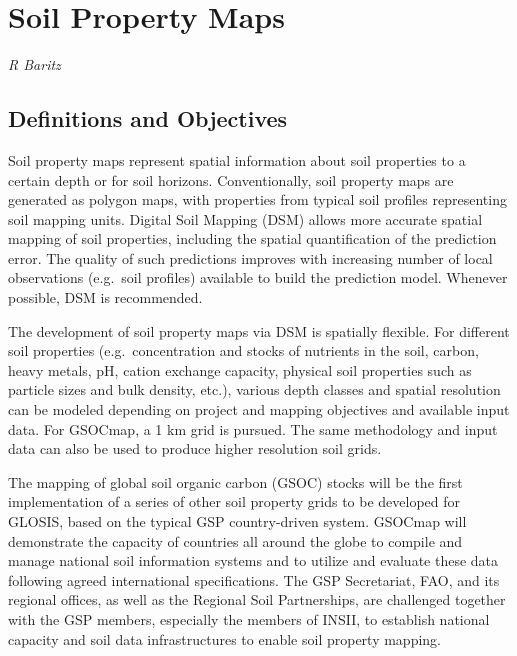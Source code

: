 \documentclass[10pt,b5paper,]{book}
\theoremstyle{definition}
\theoremstyle{definition}
\theoremstyle{definition}
\theoremstyle{remark}
\begin{document}
\hypertarget{soil-property-maps}{%
\chapter{Soil Property Maps}\label{soil-property-maps}}

\emph{R Baritz}

\hypertarget{definitions-and-objectives}{%
\section{Definitions and Objectives}\label{definitions-and-objectives}}

Soil property maps represent spatial information about soil properties
to a certain depth or for soil horizons. Conventionally, soil property
maps are generated as polygon maps, with properties from typical soil
profiles representing soil mapping units. Digital Soil Mapping (DSM)
allows more accurate spatial mapping of soil properties, including the
spatial quantification of the prediction error. The quality of such
predictions improves with increasing number of local observations
(e.g.~soil profiles) available to build the prediction model. Whenever
possible, DSM is recommended.

The development of soil property maps via DSM is spatially flexible. For
different soil properties (e.g.~concentration and stocks of nutrients in
the soil, carbon, heavy metals, pH, cation exchange capacity, physical
soil properties such as particle sizes and bulk density, etc.), various
depth classes and spatial resolution can be modeled depending on project
and mapping objectives and available input data. For GSOCmap, a 1 km
grid is pursued. The same methodology and input data can also be used to
produce higher resolution soil grids.

The mapping of global soil organic carbon (GSOC) stocks will be the
first implementation of a series of other soil property grids to be
developed for GLOSIS, based on the typical GSP country-driven system.
GSOCmap will demonstrate the capacity of countries all around the globe
to compile and manage national soil information systems and to utilize
and evaluate these data following agreed international specifications.
The GSP Secretariat, FAO, and its regional offices, as well as the
Regional Soil Partnerships, are challenged together with the GSP
members, especially the members of INSII, to establish national capacity
and soil data infrastructures to enable soil property mapping.
\end{document}
